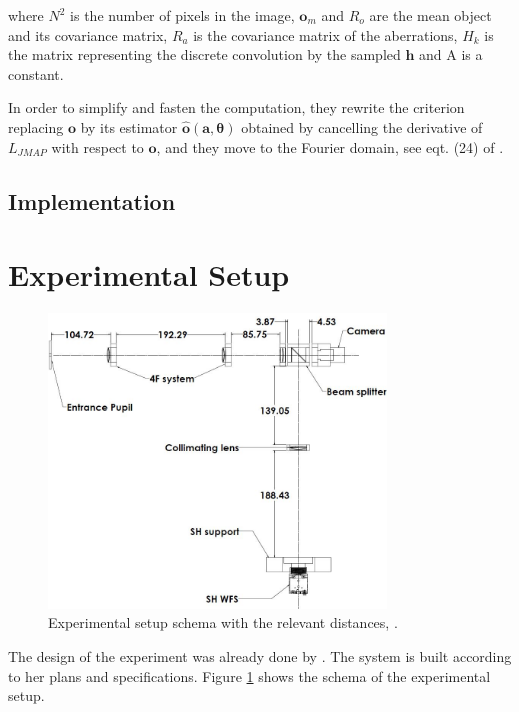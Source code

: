 where $N^2$ is the number of pixels in the image, $\mathbf{o}_m$ and $R_o$ are the mean object and its covariance matrix, $R_a$ is the covariance matrix of the aberrations, $H_k$ is the matrix representing the discrete convolution by the sampled $\mathbf{h}$ and A is a constant.

In order to simplify and fasten the computation, they rewrite the criterion replacing $\mathbf{o}$ by its estimator $\hat{\mathbf{o}}(\mathbf{a},\boldsymbol{\theta})$ obtained by cancelling the derivative of $L_{JMAP}$ with respect to $\mathbf{o}$, and they move to the Fourier domain, see eqt. (24) of \citet[p.21]{mugnier_2006}.

\subsection{Implementation}
\label{subsec:OneraAlgoImp}

\section{Experimental Setup}
\label{sec:ExpSetup}
\begin{figure}
\begin{center}
\includegraphics[width=0.8\textwidth,angle=0]{Figures/setupSchema.JPG}
\decoRule
\caption[Experimental Setup Schema]{Experimental setup schema with the relevant distances, \citep{Bouxin_PDM}.}
\label{fig:setupSchema}
\end{center}
\end{figure}

The design of the experiment was already done by \citet{Bouxin_PDM}. The system is built according to her plans and specifications. Figure \ref{fig:setupSchema} shows the schema of the experimental setup.

